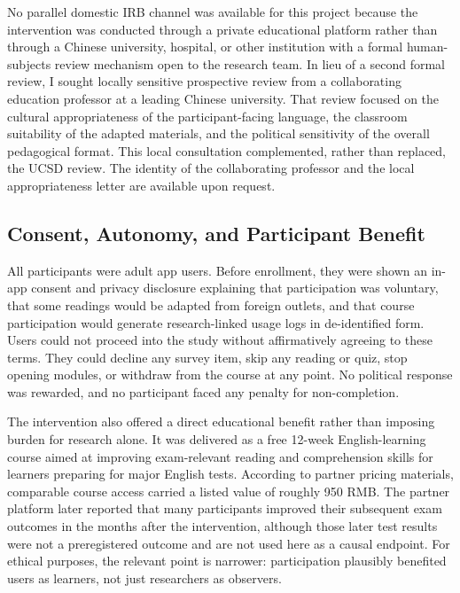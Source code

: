 \documentclass[12pt,american]{article}
\begin{document}
\begin{refsection}
		No parallel domestic IRB channel was available for this project because the intervention was conducted through a private educational platform rather than through a Chinese university, hospital, or other institution with a formal human-subjects review mechanism open to the research team. In lieu of a second formal review, I sought locally sensitive prospective review from a collaborating education professor at a leading Chinese university. That review focused on the cultural appropriateness of the participant-facing language, the classroom suitability of the adapted materials, and the political sensitivity of the overall pedagogical format. This local consultation complemented, rather than replaced, the UCSD review. The identity of the collaborating professor and the local appropriateness letter are available upon request.
		
		\subsection{Consent, Autonomy, and Participant Benefit}
		
		All participants were adult app users. Before enrollment, they were shown an in-app consent and privacy disclosure explaining that participation was voluntary, that some readings would be adapted from foreign outlets, and that course participation would generate research-linked usage logs in de-identified form. Users could not proceed into the study without affirmatively agreeing to these terms. They could decline any survey item, skip any reading or quiz, stop opening modules, or withdraw from the course at any point. No political response was rewarded, and no participant faced any penalty for non-completion.
		
		The intervention also offered a direct educational benefit rather than imposing burden for research alone. It was delivered as a free 12-week English-learning course aimed at improving exam-relevant reading and comprehension skills for learners preparing for major English tests. According to partner pricing materials, comparable course access carried a listed value of roughly 950 RMB. The partner platform later reported that many participants improved their subsequent exam outcomes in the months after the intervention, although those later test results were not a preregistered outcome and are not used here as a causal endpoint. For ethical purposes, the relevant point is narrower: participation plausibly benefited users as learners, not just researchers as observers.
		

\end{refsection}
\end{document}
